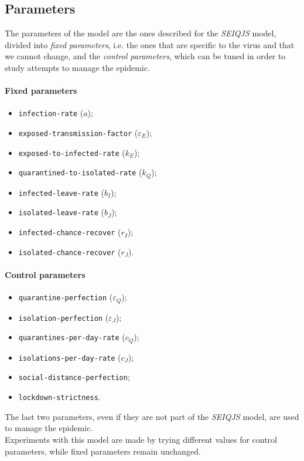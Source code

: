 \documentclass[12pt]{llncs}
\begin{document}
\subsection{Parameters}
The parameters of the model are the ones described for the \textit{SEIQJS} model, divided into \textit{fixed parameters}, i.e. the ones that are specific to the virus and that we cannot change, and the \textit{control parameters}, which can be tuned in order to study attempts to manage the epidemic.

\paragraph{Fixed parameters}
\begin{itemize}
\item \texttt{infection-rate} ($a$);
\item \texttt{exposed-transmission-factor} ($\varepsilon_E$);
\item \texttt{exposed-to-infected-rate} ($k_E$);
\item \texttt{quarantined-to-isolated-rate} ($k_Q$);
\item \texttt{infected-leave-rate} ($b_I$);
\item \texttt{isolated-leave-rate} ($b_J$);
\item \texttt{infected-chance-recover} ($r_I$);
\item \texttt{isolated-chance-recover} ($r_J$).
\end{itemize}

\paragraph{Control parameters}
\begin{itemize}
\item \texttt{quarantine-perfection} ($\varepsilon_Q$);
\item \texttt{isolation-perfection} ($\varepsilon_J$);
\item \texttt{quarantines-per-day-rate} ($c_Q$);
\item \texttt{isolations-per-day-rate} ($c_J$);
\item \texttt{social-distance-perfection};
\item \texttt{lockdown-strictness}.
\end{itemize}
The last two parameters, even if they are not part of the \textit{SEIQJS} model, are used to manage the epidemic.\\
Experiments with this model are made by trying different values for control parameters, while fixed parameters remain unchanged.
\end{document}
